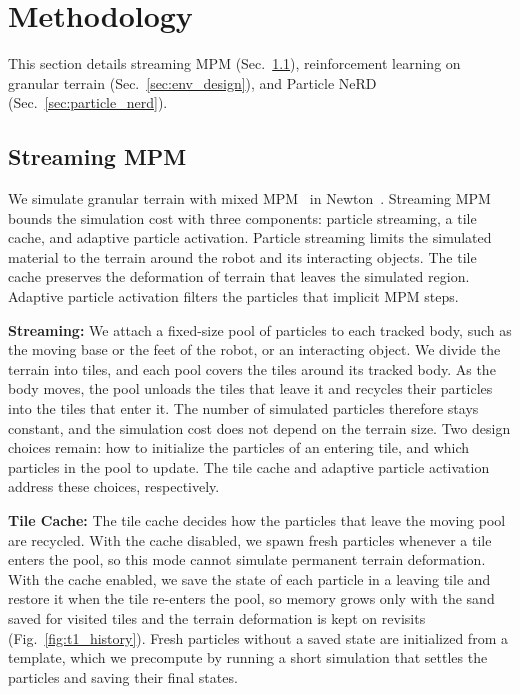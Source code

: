 \section{Methodology}
This section details streaming MPM (Sec.~\ref{sec:moving_patch}), reinforcement learning on granular terrain (Sec.~\ref{sec:env_design}), and Particle NeRD (Sec.~\ref{sec:particle_nerd}).

\subsection{Streaming MPM}
\label{sec:moving_patch}
We simulate granular terrain with mixed MPM~\cite{daviet2026mixedmpm} in Newton~\cite{newton2025}.
Streaming MPM bounds the simulation cost with three components: particle streaming, a tile cache, and adaptive particle activation.%
Particle streaming limits the simulated material to the terrain around the robot and its interacting objects.
The tile cache preserves the deformation of terrain that leaves the simulated region.
Adaptive particle activation filters the particles that implicit MPM steps.

\textbf{Streaming:}
We attach a fixed-size pool of particles to each tracked body, such as the moving base or the feet of the robot, or an interacting object.
We divide the terrain into tiles, and each pool covers the tiles around its tracked body.
As the body moves, the pool unloads the tiles that leave it and recycles their particles into the tiles that enter it.
The number of simulated particles therefore stays constant, and the simulation cost does not depend on the terrain size.
Two design choices remain: how to initialize the particles of an entering tile, and which particles in the pool to update.
The tile cache and adaptive particle activation address these choices, respectively.

\textbf{Tile Cache:}
The tile cache decides how the particles that leave the moving pool are recycled.
With the cache disabled, we spawn fresh particles whenever a tile enters the pool, so this mode cannot simulate permanent terrain deformation.
With the cache enabled, we save the state of each particle in a leaving tile and restore it when the tile re-enters the pool, so memory grows only with the sand saved for visited tiles and the terrain deformation is kept on revisits (Fig.~\ref{fig:t1_history}).
Fresh particles without a saved state are initialized from a template, which we precompute by running a short simulation that settles the particles and saving their final states.

